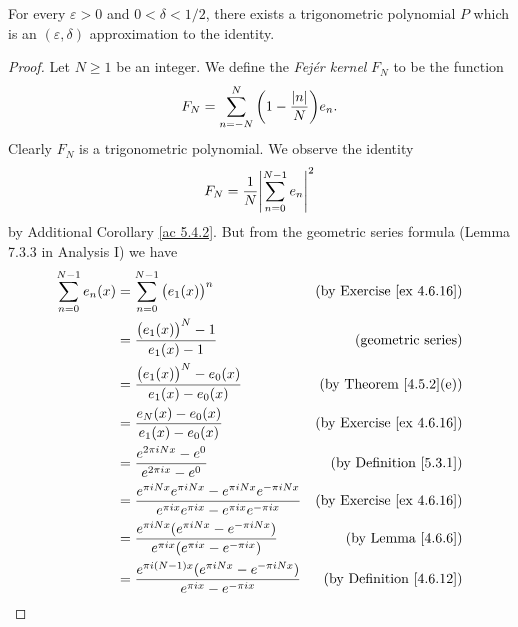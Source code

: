 \begin{lemma}\label{5.4.6}
    For every \(\varepsilon > 0\) and \(0 < \delta < 1 / 2\), there exists a trigonometric polynomial \(P\) which is an \((\varepsilon, \delta)\) approximation to the identity.
\end{lemma}

\begin{proof}
    Let \(N \geq 1\) be an integer.
    We define the \emph{Fejér kernel} \(F_N\) to be the function
    \[
        F_N = \sum_{n = -N}^N \bigg(1 - \frac{\left\lvert n\right\rvert}{N}\bigg) e_n.
    \]
    Clearly \(F_N\) is a trigonometric polynomial.
    We observe the identity
    \[
        F_N = \frac{1}{N} \abs{\sum_{n = 0}^{N - 1} e_n}^2
    \]
    by Additional Corollary \ref{ac 5.4.2}.
    But from the geometric series formula (Lemma 7.3.3 in Analysis I) we have
    \begin{align*}
        \sum_{n = 0}^{N - 1} e_n(x) & = \sum_{n = 0}^{N - 1} \big(e_1(x)\big)^n                                                                               & \text{(by Exercise \ref{ex 4.6.16})} \\
                                    & = \frac{\big(e_1(x)\big)^N - 1}{e_1(x) - 1}                                                                             & \text{(geometric series)}            \\
                                    & = \frac{\big(e_1(x)\big)^N - e_0(x)}{e_1(x) - e_0(x)}                                                                   & \text{(by Theorem \ref{4.5.2}(e))}   \\
                                    & = \frac{e_N(x) - e_0(x)}{e_1(x) - e_0(x)}                                                                               & \text{(by Exercise \ref{ex 4.6.16})} \\
                                    & = \frac{e^{2 \pi i N x} - e^0}{e^{2 \pi i x} - e^0}                                                                     & \text{(by Definition \ref{5.3.1})}   \\
                                    & = \frac{e^{\pi i N x} e^{\pi i N x} - e^{\pi i N x} e^{-\pi i N x}}{e^{\pi i x} e^{\pi i x} - e^{\pi i x} e^{-\pi i x}} & \text{(by Exercise \ref{ex 4.6.16})} \\
                                    & = \frac{e^{\pi i N x} (e^{\pi i N x} - e^{-\pi i N x})}{e^{\pi i x} (e^{\pi i x} - e^{-\pi i x})}                       & \text{(by Lemma \ref{4.6.6})}        \\
                                    & = \frac{e^{\pi i (N - 1) x} (e^{\pi i N x} - e^{-\pi i N x})}{e^{\pi i x} - e^{-\pi i x}}                               & \text{(by Definition \ref{4.6.12})}  \\

\end{align*}
\end{proof}

